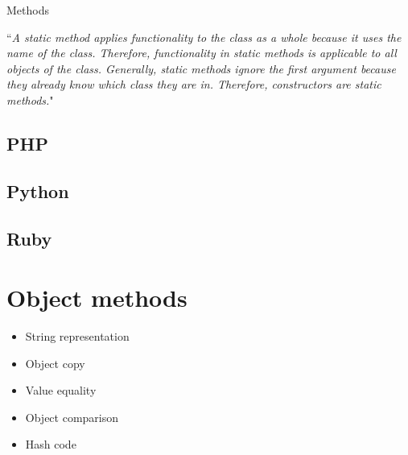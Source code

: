 \documentclass{KodeBook}
\begin{document}
Methods





``\textit{A static method applies functionality to the class as a whole because it uses the name of the class. Therefore, functionality in static methods is applicable to all objects of the class. Generally, static methods ignore the first argument because they already know which class they are in. Therefore, constructors are static methods.}"

\subsection{PHP}







\subsection{Python}



\subsection{Ruby}








\section{Object methods}

\begin{itemize}
	\item String representation
	\item Object copy
	\item Value equality
	\item Object comparison
	\item Hash code
\end{itemize}
\end{document}
